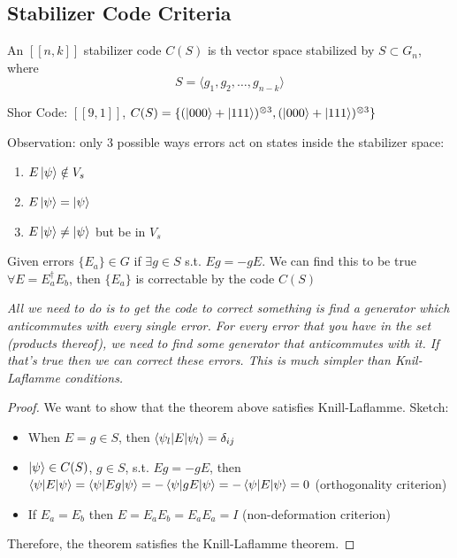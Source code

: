 \subsection{Stabilizer Code Criteria}
\begin{definition}
    An $[[n,k]]$ stabilizer code $C(S)$ is th vector space stabilized by $S \subset G_n$, where 
    \begin{equation}
        S = \langle g_1, g_2, \ldots, g_{n-k} \rangle
    \end{equation}
\end{definition}
\begin{example}
    Shor Code: 
    $[[9,1]]$, $C(S) = \{(\ket{000} + \ket{111})^{\otimes 3}, (\ket{000} + \ket{111})^{\otimes 3}\}$
\end{example}
Observation: only 3 possible ways errors act on states inside the stabilizer space:
\begin{enumerate}
    \item $E \ket{\psi} \notin V_s$
    \item $E\ket{\psi} =\ket{\psi}$
    \item $E \ket{\psi} \neq \ket{\psi}$ but be in $V_s$
\end{enumerate}
\begin{theorem}
    Given errors $\{E_a\} \in G$ if $\exists g \in S$ s.t. $Eg= -gE$. We can find this to be true $\forall E = E_a^\dagger E_b$, then $\{E_a\}$ is correctable by the code $C(S)$
\end{theorem}
\textit{All we need to do is to get the code to correct something is find a generator which anticommutes with every single error. For every error that you have in the set (products thereof), we need to find some generator that anticommutes with it. If that's true then we can correct these errors. This is much simpler than Knil-Laflamme conditions.} 
\begin{proof}
    We want to show that the theorem above satisfies Knill-Laflamme. Sketch: 
    \begin{itemize}
        \item When $E = g \in S$, then $\braket{\psi_l|E|\psi_l} = \delta_{ij}$
        \item $\ket{\psi} \in C(S)$, $g \in S$, s.t. $Eg = -gE$, then $\braket{\psi|E|\psi} = \braket{\psi|Eg|\psi} = - \braket{\psi|gE|\psi} = -\braket{\psi|E|\psi} = 0$ (orthogonality criterion) 
        \item If $E_a = E_b$ then $E=E_aE_b = E_aE_a = I$ (non-deformation criterion)
    \end{itemize}
    Therefore, the theorem satisfies the Knill-Laflamme theorem. 
\end{proof}
